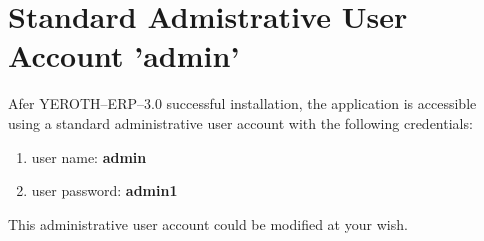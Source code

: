\documentclass[a4paper, 10pt]{article}
\newcommand{\yerotherptroiszero}{\textcolor{yerenColorBlue}{\sc YEROTH--ERP--$3.0$}\xspace}
\begin{document}
\section{Standard Admistrative User Account 'admin'}


Afer \yerotherptroiszero successful installation,
the application is accessible using a standard
administrative user account with the following
credentials:

\begin{enumerate}[1)]
	\item user name: \textbf{admin}
	\item user password: \textbf{admin1}
\end{enumerate}

This administrative user account could be modified at your wish.
\end{document}
